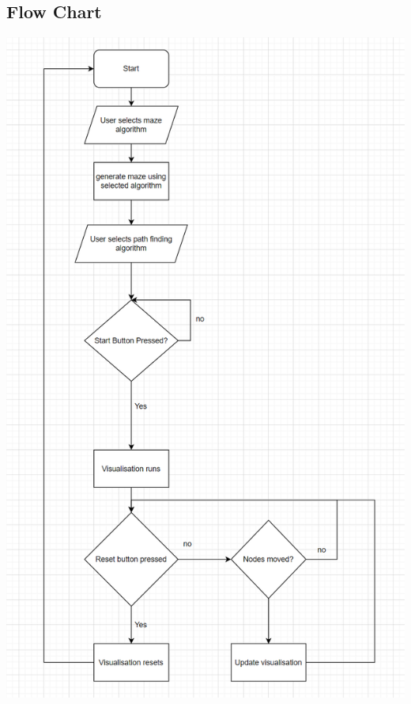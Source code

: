 \documentclass{article}
\begin{document}
\subsection{Flow Chart}
\includegraphics[width=\linewidth]{assets/flow chart.PNG}
\end{document}
